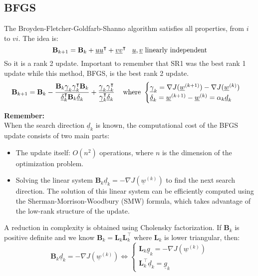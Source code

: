 \subsection{BFGS}
The Broyden-Fletcher-Goldfarb-Shanno algorithm satisfies all properties, from $i$ to $vi$. The idea is:
\[
    \mathbf{B}_{k+1} = \mathbf{B}_k + \underline{u}\underline{u}^\intercal + \underline{v}\underline{v}^\intercal \hspace{0.3cm} \underline{u},\underline{v}\text{ linearly independent} 
\] 
So it is a rank 2 update. Important to remember that SR1 was the best rank 1 update while this method, BFGS, is the best rank 2 update.
\[
    \mathbf{B}_{k+1} = \mathbf{B}_k - \frac{\mathbf{B}_k\underline{\gamma}_k\underline{\gamma}_k^\intercal \mathbf{B}_k}{\underline{\delta}_k^\intercal \mathbf{B}_k \underline{\delta}_k} + \frac{\underline{\gamma}_k\underline{\gamma}_k^\intercal}{\underline{\gamma}_k^\intercal \underline{\delta}_k} \hspace{0.3cm} \text{ where } \begin{cases}
        \underline{\gamma}_k = \nabla J(\underline{w}^{(k+1)}) - \nabla J(\underline{w}^{(k)})\\
        \underline{\delta}_k = \underline{w}^{(k+1)} - \underline{w}^{(k)} = \alpha_k \underline{d}_k
    \end{cases}
\]

\textbf{Remember: }\\
When the search direction \(\underline{d}_k\) is known, the computational cost of the BFGS update consists of two main parts:

\begin{itemize}
  \item The update itself: \(O(n^2)\) operations, where \(n\) is the dimension of the optimization problem.
  \item Solving the linear system \(\mathbf{B}_k \underline{d}_k = -\nabla J(\underline{w}^{(k)})\) to find the next search direction. The solution of this linear system can be efficiently computed using the Sherman-Morrison-Woodbury (SMW) formula, which takes advantage of the low-rank structure of the update. 
\end{itemize}


A reduction in complexity is obtained using Cholensky factorization. If $\mathbf{B}_k$ is positive definite and we know $\mathbf{B}_k = \mathbf{L}_k \mathbf{L}_k^\intercal$ where $\mathbf{L}_k$ is lower triangular, then:
\[
    \mathbf{B}_k \underline{d}_k = - \nabla J(\underline{w}^{(k)}) \iff \begin{cases}
        \mathbf{L}_k \underline{g}_k = - \nabla J(\underline{w}^{(k)})\\
        \mathbf{L}_k^\intercal \underline{d}_k = \underline{g}_k
    \end{cases}
\]

